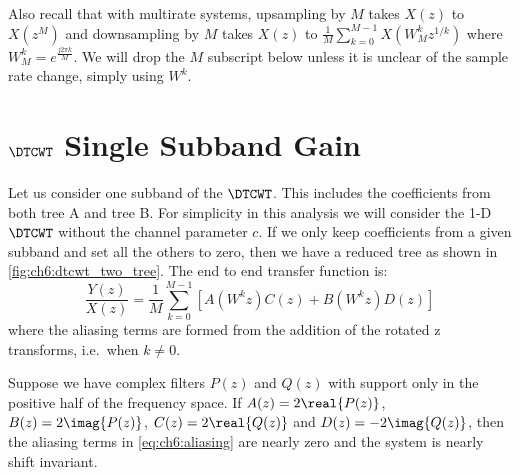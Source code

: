 Also recall that with multirate systems, upsampling by $M$ takes $X(z)$ to
$X(z^M)$ and downsampling by $M$ takes $X(z)$ to $\frac{1}{M}\sum_{k=0}^{M-1} X(W_M^k
z^{1/k})$ where $W_M^k = e^{\frac{j2\pi k}{M}}$. We will drop the $M$ subscript
below unless it is unclear of the sample rate change, simply using $W^k$.

\section{$\DTCWT$ Single Subband Gain}

\begin{figure}
  \centering
  
  \label{fig:ch6:dtcwt_two_tree}
\end{figure}

Let us consider one subband of the $\DTCWT$. This includes the coefficients from
both tree A and tree B. For simplicity in this analysis we will consider the 1-D
$\DTCWT$ without the channel parameter $c$. If we only keep coefficients from a given
subband and set all the others to zero, then we have a reduced tree as shown in
\autoref{fig:ch6:dtcwt_two_tree}. The end to end transfer function is:
%
\begin{equation}
  \frac{Y(z)}{X(z)} = \frac{1}{M} \sum_{k=0}^{M-1} \left[A(W^k z)C(z) + B(W^k z)D(z)\right]
  \label{eq:ch6:aliasing}
\end{equation}
%
where the aliasing terms are formed from the addition of the rotated z
transforms, i.e.\ when $k \neq 0$.

\begin{theorem} \label{thm:ch6:shiftinv}
  Suppose we have complex filters $P(z)$ and $Q(z)$ with support only in the
  positive half of the frequency space. If $A(z) = 2\real{P(z)}$, $B(z) =
  2\imag{P(z)}$, $C(z) = 2\real{Q(z)}$ and $D(z) = -2\imag{Q(z)}$, then the aliasing
  terms in \eqref{eq:ch6:aliasing} are nearly zero and the system is nearly
  shift invariant.
\end{theorem}

